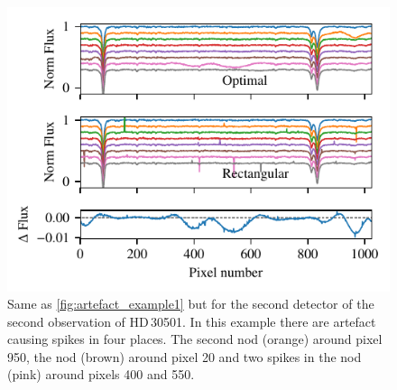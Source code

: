 \begin{figure}
    \centering
    \includegraphics[width=0.7\linewidth]{figures/appendix/bp_plots/extraction_comparision_HD30501-2b_chip_2}
    \caption{Same as \cref{fig:artefact_example1} but for the second detector of the second observation of {HD\,30501}.
    In this example there are artefact causing spikes in four places.
    The second nod (orange) around pixel 950, the  nod (brown) around pixel 20 and two spikes in the  nod (pink) around pixels 400 and 550.}
    \label{fig:artefact_example7}
\end{figure}
